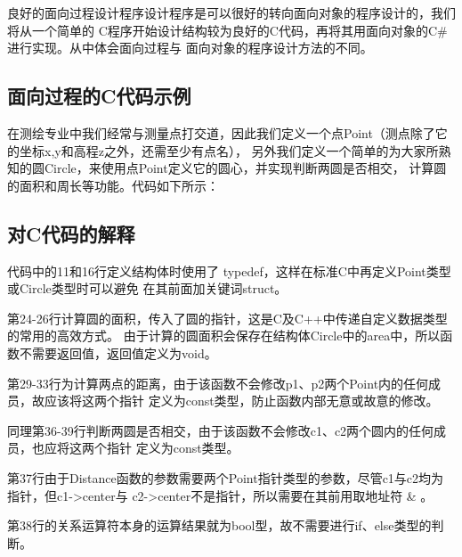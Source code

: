 良好的面向过程设计程序设计程序是可以很好的转向面向对象的程序设计的，我们将从一个简单的
C程序开始设计结构较为良好的C代码，再将其用面向对象的C\#进行实现。从中体会面向过程与
面向对象的程序设计方法的不同。
 
 \subsection{面向过程的C代码示例}
 
在测绘专业中我们经常与测量点打交道，因此我们定义一个点Point（测点除了它的坐标x,y和高程z之外，还需至少有点名），
 另外我们定义一个简单的为大家所熟知的圆Circle，来使用点Point定义它的圆心，并实现判断两圆是否相交，
 计算圆的面积和周长等功能。代码如下所示：





% 
% 
% 

\subsection{对C代码的解释}
代码中的11和16行定义结构体时使用了 typedef，这样在标准C中再定义Point类型或Circle类型时可以避免
在其前面加关键词struct。

第24-26行计算圆的面积，传入了圆的指针，这是C及C++中传递自定义数据类型的常用的高效方式。
由于计算的圆面积会保存在结构体Circle中的area中，所以函数不需要返回值，返回值定义为void。

第29-33行为计算两点的距离，由于该函数不会修改p1、p2两个Point内的任何成员，故应该将这两个指针
定义为const类型，防止函数内部无意或故意的修改。

同理第36-39行判断两圆是否相交，由于该函数不会修改c1、c2两个圆内的任何成员，也应将这两个指针
定义为const类型。

第37行由于Distance函数的参数需要两个Point指针类型的参数，尽管c1与c2均为指针，但c1->center与
c2->center不是指针，所以需要在其前用取地址符 \& 。

第38行的关系运算符本身的运算结果就为bool型，故不需要进行if、else类型的判断。


